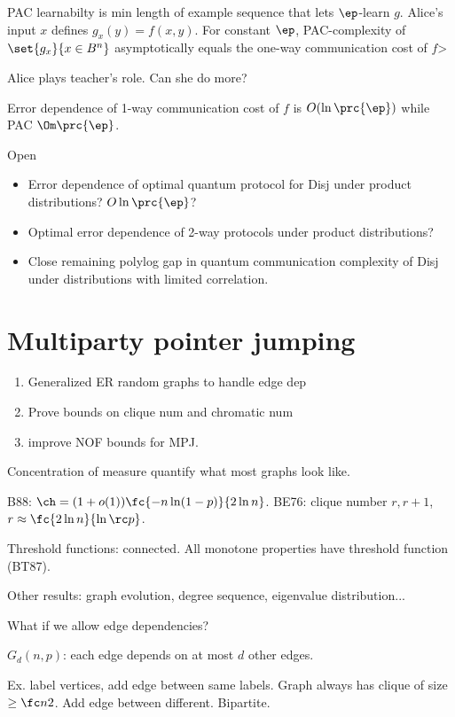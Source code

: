 PAC learnabilty is min length of example sequence that lets $\ep$-learn $g$.
Alice's input $x$ defines $g_x(y)=f(x,y)$.
For constant $\ep$, PAC-complexity of $\set{g_x}{x\in B^n}$ asymptotically equals the one-way communication cost of $f$> 

Alice plays teacher's role. Can she do more?

Error dependence of 1-way communication cost of $f$ is $O(\ln \prc{\ep})$ while PAC $\Om\prc{\ep}$.

Open
\begin{itemize}
\item
Error dependence of optimal quantum protocol for Disj under product distributions? $O\ln \prc{\ep}$?
\item
Optimal error dependence of 2-way protocols under product distributions?
\item
Close remaining polylog gap in quantum communication complexity of Disj under distributions with limited correlation.
\end{itemize}



\section{Multiparty pointer jumping}
\begin{enumerate}
\item
Generalized ER random graphs to handle edge dep
\item
Prove bounds on clique num and chromatic num
\item
improve NOF bounds for MPJ.
\end{enumerate}

Concentration of measure quantify what most graphs look like.

B88: $\ch=(1+o(1))\fc{-n \ln (1-p)}{2\ln n}$. 
BE76: clique number $r,r+1$, $r\approx \fc{2\ln n}{\ln \rc p}$.

Threshold functions: connected. All monotone properties have threshold function (BT87).

Other results: graph evolution, degree sequence, eigenvalue distribution...

What if we allow edge dependencies?

$G_d(n,p)$: each edge depends on at most $d$ other edges.

Ex. label vertices, add edge between same labels. Graph always has clique of size $\ge \fc n2$. Add edge between different. Bipartite.

